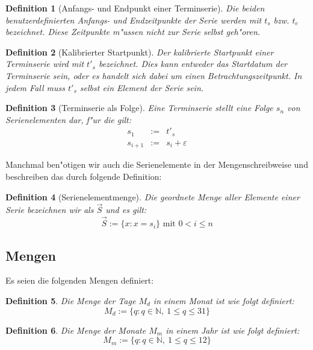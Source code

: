 \documentclass[a4paper]{article}
\numberwithin{equation}{section}
\newtheorem{dfn}{Definition}
\begin{document}
\begin{dfn}[Anfangs- und Endpunkt einer Terminserie]
  Die beiden benutzerdefinierten Anfangs- und Endzeitpunkte der Serie werden mit
  $t_s$ bzw. $t_e$ bezeichnet. Diese Zeitpunkte m"ussen nicht zur Serie selbst
  geh"oren.
\end{dfn}

\begin{dfn}[Kalibrierter Startpunkt]
  Der kalibrierte Startpunkt einer Terminserie wird mit $t'_s$ bezeichnet. Dies
  kann entweder das Startdatum der Terminserie sein, oder es handelt sich dabei
  um einen Betrachtungszeitpunkt. In jedem Fall muss $t'_s$ selbst ein Element
  der Serie sein.
\end{dfn}

\begin{dfn}[Terminserie als Folge]\label{def:seriesAsSeries}
  Eine Terminserie stellt eine Folge $s_n$ von Serienelementen dar, f"ur die
  gilt:
  \begin{eqnarray}
    s_1 & := & t'_s \\
    s_{i+1} & := & s_i + \varepsilon
  \end{eqnarray}
\end{dfn}

Manchmal ben"otigen wir auch die Serienelemente in der Mengenschreibweise und
beschreiben das durch folgende Definition:
\begin{dfn}[Serienelementmenge]
  Die geordnete Menge aller Elemente einer Serie bezeichnen wir als $\vec{S}$
  und es gilt:
  \begin{equation}
    \vec{S} := \{ x : x = s_i \} \text{ mit } 0 < i \le n
  \end{equation}
\end{dfn}


%
%
\subsection{Mengen}
Es seien die folgenden Mengen definiert:
\begin{dfn}
  Die Menge der Tage $M_d$ in einem Monat ist wie folgt definiert:
  \begin{equation}
    M_d := \{ q : q \in \mathbb{N},\ 1 \le q \le 31 \}
  \end{equation}
\end{dfn}

\begin{dfn}
  Die Menge der Monate $M_m$ in einem Jahr ist wie folgt definiert:
  \begin{equation}
    M_m := \{ q : q \in \mathbb{N},\ 1 \le q \le 12 \}
  \end{equation}
\end{dfn}
\end{document}
